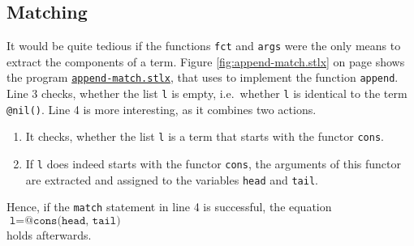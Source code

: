 \subsection{Matching}
It would be quite tedious if the functions \texttt{fct} and \texttt{args} were the only means to extract the
components of a term.  Figure \ref{fig:append-match.stlx} on page \pageref{fig:append-match.stlx}
shows the program
\href{https://github.com/karlstroetmann/Logik/blob/master/SetlX/append-match.stlx}{\texttt{append-match.stlx}}, 
that uses  to implement the function \texttt{append}.  
Line 3 checks, whether the list  \texttt{l} is empty, i.e.~whether \texttt{l} is identical to the term 
\texttt{@nil()}.  Line 4 is more interesting, as it combines two actions.
\begin{enumerate}
\item It checks, whether the list \texttt{l} is a term that starts with the functor \texttt{cons}.
\item If \texttt{l} does indeed starts with the functor \texttt{cons}, the arguments of this functor are
      extracted and assigned to the variables \texttt{head} and \texttt{tail}.
\end{enumerate}
Hence, if the \texttt{match} statement in line 4 is successful, the equation
\\[0.2cm]
\hspace*{1.3cm}
$\texttt{l} = \texttt{@cons(head, tail)}$
\\[0.2cm]
holds afterwards.



